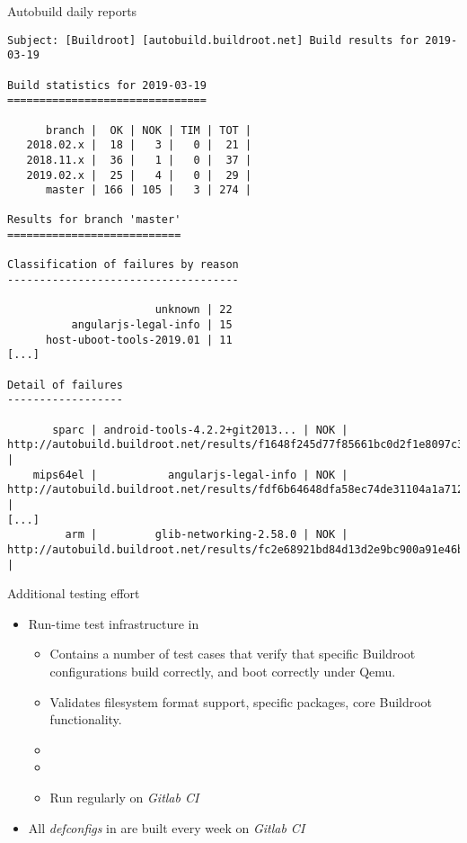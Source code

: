 \begin{frame}[fragile]{Autobuild daily reports}

{\tiny
\begin{verbatim}
Subject: [Buildroot] [autobuild.buildroot.net] Build results for 2019-03-19

Build statistics for 2019-03-19
===============================

      branch |  OK | NOK | TIM | TOT |
   2018.02.x |  18 |   3 |   0 |  21 |
   2018.11.x |  36 |   1 |   0 |  37 |
   2019.02.x |  25 |   4 |   0 |  29 |
      master | 166 | 105 |   3 | 274 |

Results for branch 'master'
===========================

Classification of failures by reason
------------------------------------

                       unknown | 22
          angularjs-legal-info | 15
      host-uboot-tools-2019.01 | 11
[...]

Detail of failures
------------------

       sparc | android-tools-4.2.2+git2013... | NOK | http://autobuild.buildroot.net/results/f1648f245d77f85661bc0d2f1e8097c3695206d8 |     
    mips64el |           angularjs-legal-info | NOK | http://autobuild.buildroot.net/results/fdf6b64648dfa58ec74de31104a1a71248242d80 |     
[...]
         arm |         glib-networking-2.58.0 | NOK | http://autobuild.buildroot.net/results/fc2e68921bd84d13d2e9bc900a91e46b08d698fe |     
\end{verbatim}}

\end{frame}

\begin{frame}{Additional testing effort}
  \begin{itemize}
  \item Run-time test infrastructure in 
    \begin{itemize}
    \item Contains a number of test cases that verify that specific
      Buildroot configurations build correctly, and boot correctly
      under Qemu.
    \item Validates filesystem format support, specific packages, core
      Buildroot functionality.
    \item {}
    \item {}
    \item Run regularly on {\em Gitlab CI}
    \end{itemize}
  \item All {\em defconfigs} in  are built every week
    on {\em Gitlab CI}
  \end{itemize}
\end{frame}
